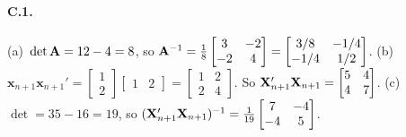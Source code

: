 \documentclass{article}
\begin{document}
\bigskip

\paragraph{C.1.}  (a)~$\det {\mathbf A} = 12 - 4 = 8$, so ${\mathbf A}^{-1} = \frac{1}{8}\begin{bmatrix}3 & -2\\ -2 & 4\end{bmatrix} = \begin{bmatrix}3/8 & -1/4\\ -1/4 & 1/2\end{bmatrix}$.  (b)~$\bm x_{n+1}\bm x_{n+1}' = \begin{bmatrix}1\\ 2\end{bmatrix}\begin{bmatrix}1 & 2\end{bmatrix} = \begin{bmatrix}1 & 2\\ 2 & 4\end{bmatrix}$.  So ${\mathbf X}_{n+1}'{\mathbf X}_{n+1} = \begin{bmatrix}5 & 4\\ 4 & 7\end{bmatrix}$.  (c)~$\det = 35 - 16 = 19$, so $({\mathbf X}_{n+1}'{\mathbf X}_{n+1})^{-1} = \frac{1}{19}\begin{bmatrix}7 & -4\\ -4 & 5\end{bmatrix}$.
\end{document}
